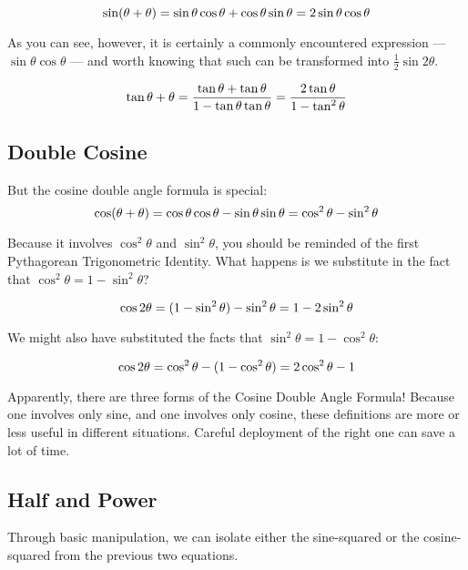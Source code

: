 \begin{equation}
\sin (\theta + \theta) = \sin\theta\cos\theta + \cos\theta\sin\theta\\
= 2\sin\theta\cos\theta
\end{equation}

As you can see, however, it is certainly a commonly encountered expression --- $\sin\theta\cos\theta$
--- and worth knowing that such can be transformed into $\frac{1}{2}\sin2\theta$.

\begin{equation}
\tan{\theta + \theta} = \frac{\tan\theta + \tan\theta}{1 - \tan\theta\tan\theta}\\
= \frac{2\tan\theta}{1 - \tan^2\theta}
\end{equation}

\subsection{Double Cosine}
But the cosine double angle formula is special:
\begin{equation}
\cos(\theta+\theta) = \cos\theta\cos\theta - \sin\theta\sin\theta\\
=\cos^2\theta - \sin^2\theta
\end{equation}

Because it involves $\cos^2\theta$ and $\sin^2\theta$, you should be reminded of the 
first Pythagorean Trigonometric Identity.  What happens is we substitute in the fact that
$\cos^2\theta = 1 - \sin^2\theta$?

\begin{equation}
\cos2\theta = (1 - \sin^2\theta) - \sin^2\theta\\
=1 - 2\sin^2\theta
\end{equation}

We might also have substituted the facts that $\sin^2\theta = 1 - \cos^2\theta$:

\begin{equation}
\cos2\theta = \cos^2\theta - (1 - \cos^2\theta)\\
=2\cos^2\theta - 1
\end{equation}

Apparently, there are three forms of the Cosine Double Angle Formula!  Because one involves
only sine, and one involves only cosine, these definitions are more or less useful in different
situations.  Careful deployment of the right one can save a lot of time.

\subsection{Half and Power}
Through basic manipulation, we can isolate either the sine-squared or the cosine-squared
from the previous two equations.

